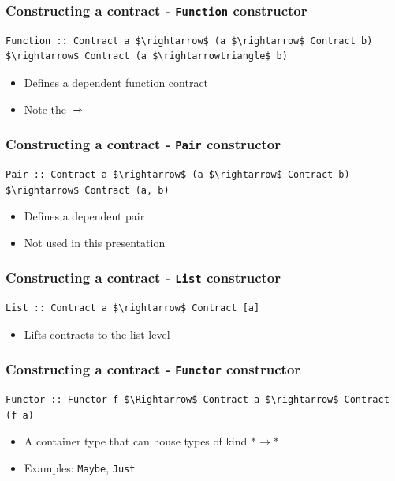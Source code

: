 \documentclass[]{beamer}
\begin{document}
\begin{frame}[fragile]
\frametitle{Constructing a contract - \texttt{Function} constructor}

\begin{lstlisting}[mathescape]
Function :: Contract a $\rightarrow$ (a $\rightarrow$ Contract b) $\rightarrow$ Contract (a $\rightarrowtriangle$ b)
\end{lstlisting}

\begin{itemize}
	\item Defines a dependent function contract
	\item Note the $\rightarrowtriangle$
\end{itemize}

\end{frame}

\begin{frame}[fragile]
\frametitle{Constructing a contract - \texttt{Pair} constructor}

\begin{lstlisting}[mathescape]
Pair :: Contract a $\rightarrow$ (a $\rightarrow$ Contract b) $\rightarrow$ Contract (a, b)
\end{lstlisting}

\begin{itemize}
	\item Defines a dependent pair
	\item Not used in this presentation
\end{itemize}

\end{frame}

\begin{frame}[fragile]
\frametitle{Constructing a contract - \texttt{List} constructor}

\begin{lstlisting}[mathescape]
List :: Contract a $\rightarrow$ Contract [a]
\end{lstlisting}

\begin{itemize}
	\item Lifts contracts to the list level
\end{itemize}

\end{frame}

\begin{frame}[fragile]
\frametitle{Constructing a contract - \texttt{Functor} constructor}

\begin{lstlisting}[mathescape]
Functor :: Functor f $\Rightarrow$ Contract a $\rightarrow$ Contract (f a)
\end{lstlisting}

\begin{itemize}
	\item A container type that can house types of kind $* \rightarrow *$
	\item Examples: \texttt{Maybe}, \texttt{Just}
\end{itemize}

\end{frame}
\end{document}

